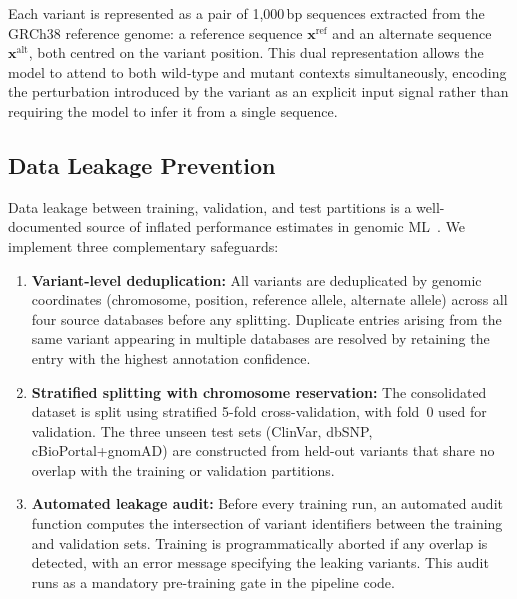\documentclass[journal]{IEEEtran}
\begin{document}
Each variant is represented as a pair of 1,000\,bp sequences
extracted from the GRCh38 reference genome: a reference sequence
$\mathbf{x}^{\text{ref}}$ and an alternate sequence
$\mathbf{x}^{\text{alt}}$, both centred on the variant position.
This dual representation allows the model to attend to both
wild-type and mutant contexts simultaneously, encoding the
perturbation introduced by the variant as an explicit input
signal rather than requiring the model to infer it from a
single sequence.

\subsection{Data Leakage Prevention}

Data leakage between training, validation, and test partitions
is a well-documented source of inflated performance estimates
in genomic ML~\cite{Whalen2022}.
We implement three complementary safeguards:

\begin{enumerate}
  \item \textbf{Variant-level deduplication:}
        All variants are deduplicated by genomic coordinates
        (chromosome, position, reference allele, alternate allele)
        across all four source databases before any splitting.
        Duplicate entries arising from the same variant appearing
        in multiple databases are resolved by retaining the
        entry with the highest annotation confidence.

  \item \textbf{Stratified splitting with chromosome reservation:}
        The consolidated dataset is split using stratified
        5-fold cross-validation, with fold~0 used for
        validation. The three unseen test sets (ClinVar,
        dbSNP, cBioPortal+gnomAD) are constructed from
        held-out variants that share no overlap with the
        training or validation partitions.

  \item \textbf{Automated leakage audit:}
        Before every training run, an automated audit function
        computes the intersection of variant identifiers
        between the training and validation sets.
        Training is programmatically aborted if any overlap
        is detected, with an error message specifying the
        leaking variants.
        This audit runs as a mandatory pre-training gate in
        the pipeline code.
\end{enumerate}
\end{document}
